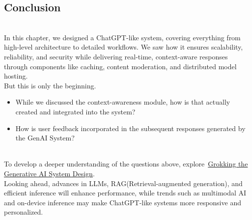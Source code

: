 \subsection{Conclusion}\label{3y0zGOifMPf7VYecYjlTG}
\\
In this chapter, we designed a ChatGPT-like system, covering everything from high-level architecture to detailed workflows. We saw how it ensures scalability, reliability, and security while delivering real-time, context-aware responses through components like caching, content moderation, and distributed model hosting.
\\
But this is only the beginning.

\begin{itemize}
\item
\protect{}\label{MqIzJ4-Msvgkhgatlu0AE}
While we discussed the context-awareness module, how is that actually created and integrated into the system?
\item
\protect{}\label{FlK8aCEb6OjS7XNL6yD-j}
How is user feedback incorporated in the subsequent responses generated by the GenAI System?
\end{itemize}
\\
To develop a deeper understanding of the questions above, explore~\href{https://www.educative.io/courses//generative-ai-system-design}{Grokking the Generative AI System Design}.
\\
Looking ahead, advances in LLMs, RAG(Retrieval-augmented generation), and efficient inference will enhance performance, while trends such as multimodal AI and on-device inference may make ChatGPT-like systems more responsive and personalized.

